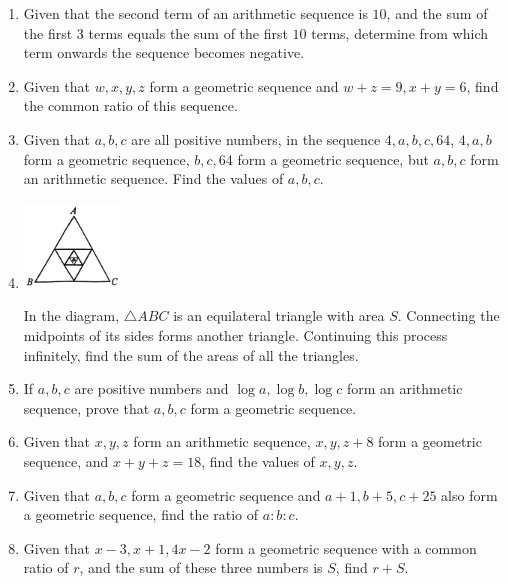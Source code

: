 \documentclass{report}
\begin{document}
\begin{enumerate}
            \item Given that the second term of an arithmetic sequence is $10$, and the sum of the first $3$ terms equals the sum of the first $10$ terms, determine from which term onwards the sequence becomes negative.
            
            \item Given that \(w, x, y, z\) form a geometric sequence and \(w+z=9, x+y=6\), find the common ratio of this sequence.
            
            \item Given that \(a, b, c\) are all positive numbers, in the sequence \(4, a, b, c, 64\), \(4, a, b\) form a geometric sequence, \(b, c, 64\) form a geometric sequence, but \(a, b, c\) form an arithmetic sequence. Find the values of \(a, b, c\).
            
            \item \parbox[t]{\textwidth}{
                \begin{center}
                    \includegraphics[width=0.2\textwidth]{assets/13-15.png}
                \end{center}
            }
            In the diagram, \(\triangle ABC\) is an equilateral triangle with area \(S\). Connecting the midpoints of its sides forms another triangle. Continuing this process infinitely, find the sum of the areas of all the triangles.
            
            \item If \(a, b, c\) are positive numbers and \(\log a, \log b, \log c\) form an arithmetic sequence, prove that \(a, b, c\) form a geometric sequence.
            
            \item Given that \(x, y, z\) form an arithmetic sequence, \(x, y, z+8\) form a geometric sequence, and \(x+y+z=18\), find the values of \(x, y, z\).
            
            \item Given that \(a, b, c\) form a geometric sequence and \(a+1, b+5, c+25\) also form a geometric sequence, find the ratio of \(a: b: c\).
            
            \item Given that \(x-3, x+1, 4x-2\) form a geometric sequence with a common ratio of \(r\), and the sum of these three numbers is \(S\), find \(r+S\).
            

\end{enumerate}
\end{document}
